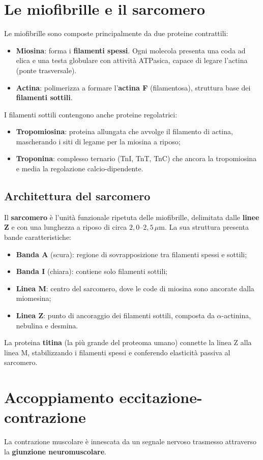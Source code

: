 \documentclass[12pt,a4paper]{report}
\begin{document}
\section{Le miofibrille e il sarcomero}
Le miofibrille sono composte principalmente da due proteine contrattili:
\begin{itemize}
\item \textbf{Miosina}: forma i \textbf{filamenti spessi}. Ogni molecola presenta una coda ad elica e una testa globulare con attività ATPasica, capace di legare l'actina (ponte trasversale).
\item \textbf{Actina}: polimerizza a formare l'\textbf{actina F} (filamentosa), struttura base dei \textbf{filamenti sottili}.
\end{itemize}
I filamenti sottili contengono anche proteine regolatrici:
\begin{itemize}
\item \textbf{Tropomiosina}: proteina allungata che avvolge il filamento di actina, mascherando i siti di legame per la miosina a riposo;
\item \textbf{Troponina}: complesso ternario (TnI, TnT, TnC) che ancora la tropomiosina e media la regolazione calcio-dipendente.
\end{itemize}
\subsection{Architettura del sarcomero}
Il \textbf{sarcomero} è l'unità funzionale ripetuta delle miofibrille, delimitata dalle \textbf{linee Z} e con una lunghezza a riposo di circa \(2{,}0\text{--}2{,}5\,\mu\mathrm{m}\). La sua struttura presenta bande caratteristiche:
\begin{itemize}
\item \textbf{Banda A} (scura): regione di sovrapposizione tra filamenti spessi e sottili;
\item \textbf{Banda I} (chiara): contiene solo filamenti sottili;
\item \textbf{Linea M}: centro del sarcomero, dove le code di miosina sono ancorate dalla miomesina;
\item \textbf{Linea Z}: punto di ancoraggio dei filamenti sottili, composta da \(\alpha\)-actinina, nebulina e desmina.
\end{itemize}
La proteina \textbf{titina} (la più grande del proteoma umano) connette la linea Z alla linea M, stabilizzando i filamenti spessi e conferendo elasticità passiva al sarcomero.

\section{Accoppiamento eccitazione-contrazione}
La contrazione muscolare è innescata da un segnale nervoso trasmesso attraverso la \textbf{giunzione neuromuscolare}.
\end{document}
